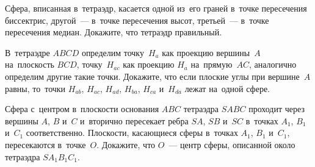\begin{problems}
\item
Сфера, вписанная в~тетраэдр, касается одной из~его граней в~точке пересечения
биссектрис, другой~— в~точке пересечения высот, третьей~— в~точке
пересечения медиан.
Докажите, что тетраэдр правильный.

\item
В~тетраэдре $ABCD$ определим
точку~$H_{a}$ как проекцию вершины~$A$ на~плоскость $BCD$,
точку~$H_{ac}$ как проекцию $H_{a}$ на~прямую~$AC$,
аналогично определим другие такие точки.
Докажите, что если плоские углы при вершине~$A$ равны, то~точки
$H_{ab}$, $H_{ac}$, $H_{ad}$, $H_{ba}$, $H_{ca}$ и~$H_{da}$ лежат на~одной
сфере.

\itemx{*}
Сфера с~центром в~плоскости основания $ABC$ тетраэдра $SABC$ проходит через
вершины $A$, $B$ и~$C$ и~вторично пересекает ребра $SA$, $SB$ и~$SC$ в~точках
$A_1$, $B_1$ и~$C_1$ соответственно.
Плоскости, касающиеся сферы в~точках $A_1$, $B_1$ и~$C_1$, пересекаются
в~точке~$O$.
Докажите, что $O$~— центр сферы, описанной около тетраэдра $S A_1 B_1 C_1$.

\end{problems}

